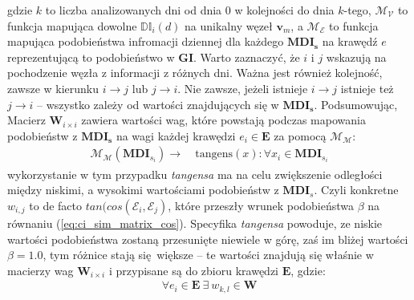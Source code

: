 gdzie $k$ to liczba analizowanych dni od dnia $0$ w kolejności do dnia $k$-tego, $\mathcal{M_{V}}$
to funkcja mapująca dowolne $\mathbb{DI}_{i}(d)$ na unikalny węzeł $\mathbf{v}_{m}$, 
a $\mathcal{M_{E}}$ to funkcja mapująca podobieństwa infromacji dziennej dla każdego 
$\mathbf{MDI_s}$ na krawędź $e$ reprezentującą to podobieństwo w $\mathbf{GI}$.
Warto zaznaczyć, że $i$ i $j$ wskazują na pochodzenie węzła z informacji z różnych dni.
Ważna jest również kolejność, zawsze w kierunku $i \xrightarrow{} j$ lub $j \xrightarrow{} i$.
Nie zawsze, jeżeli istnieje $i \xrightarrow{} j$ istnieje też $j \xrightarrow{} i$ -- 
wszystko zależy od wartości znajdujących się w $\mathbf{MDI_s}$. Podsumowując, Macierz 
$\mathbf{W}_{i \times i}$ zawiera wartości wag, które powstają podczas mapowania podobieństw 
z $\mathbf{MDI_s}$ na wagi każdej krawędzi $e_{i} \in \mathbf{E}$ za pomocą $\mathcal{M_{M}}$:
\begin{equation}
    \label{eq:tan_as_separator}
    \begin{aligned}
        \mathcal{M_{M}}(\mathbf{MDI}_{s_{i}}) \xrightarrow[]{} &  
            \: \text{tangens}(x) : \forall x_{i} \in \mathbf{MDI}_{s_{i}}
    \end{aligned}
\end{equation}
wykorzystanie w tym przypadku \textit{tangensa} ma na celu zwiększenie odległości między niskimi, 
a wysokimi wartościami podobieństw z $\mathbf{MDI}_{s}$. Czyli konkretne $w_{i,j}$ to de facto
$tan(cos(\mathcal{E}_i, \mathcal{E}_j)$, które przeszły wrunek podobieństwa $\beta$ 
na równaniu (\ref{eq:ci_sim_matrix_cos}). Specyfika \textit{tangensa} powoduje, ze niskie wartości
podobieństwa zostaną przesunięte niewiele w górę, zaś im bliżej wartości $\beta=1.0$,
tym różnice stają się większe -- te wartości znajdują się właśnie w macierzy wag 
$\mathbf{W}_{i \times i}$ i przypisane są do zbioru krawędzi $\mathbf{E}$, gdzie:
\begin{equation}
    \begin{aligned}
        \forall e_{i} \in \mathbf{E} \: \exists \: w_{k, l} \in \mathbf{W}
    \end{aligned}
\end{equation}

